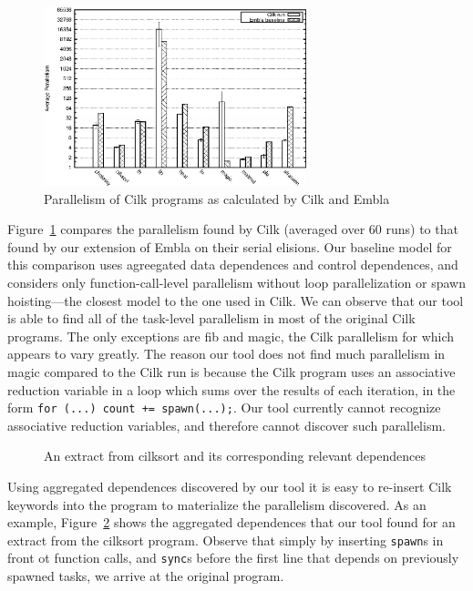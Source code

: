 \begin{figure}
 \centering
 \includegraphics[width=3in]{cilk-run}
 \caption{Parallelism of Cilk programs as calculated by Cilk and Embla}
 \label{cilk-run}
\end{figure}

Figure~\ref{cilk-run} compares the parallelism found by Cilk (averaged over 60 runs) to that found by our extension of Embla on their serial elisions.
Our baseline model for this comparison uses agreegated data dependences and control dependences, and considers only function-call-level parallelism without loop parallelization or spawn hoisting---the closest model to the one used in Cilk.
We can observe that our tool is able to find all of the task-level parallelism in most of the original Cilk programs.
The only exceptions are fib and magic, the Cilk parallelism for which appears to vary greatly.
The reason our tool does not find much parallelism in magic compared to the Cilk run is because the Cilk program uses an associative reduction variable in a loop which sums over the results of each iteration, in the form \texttt{for (...) count += spawn(...);}.
Our tool currently cannot recognize associative reduction variables, and therefore cannot discover such parallelism.

\begin{figure}
  \begin{center}
  \scriptsize
  
  \end{center}
  \nocaptionrule \caption{An extract from cilksort and its corresponding relevant dependences}
  \label{cilksort-depgraph}
\end{figure}

Using aggregated dependences discovered by our tool it is easy to re-insert Cilk keywords into the program to materialize the parallelism discovered.
As an example, Figure~\ref{cilksort-depgraph} shows the aggregated dependences that our tool found for an extract from the cilksort program.
Observe that simply by inserting \texttt{spawn}s in front ot function calls, and \texttt{sync}s before the first line that depends on previously spawned tasks, we arrive at the original program.

